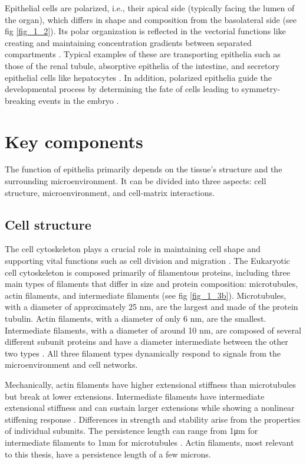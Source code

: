 Epithelial cells are polarized, i.e., their apical side (typically facing the lumen of the organ), which differs in shape and composition from the basolateral side (see fig \ref{fig_1_2}). Its polar organization is reflected in the vectorial functions like creating and maintaining concentration gradients between separated compartments \cite{marchiando2010}. Typical examples of these are transporting epithelia such as those of the renal tubule, absorptive epithelia of the intestine, and secretory epithelial cells like hepatocytes \cite{alberts2015}. In addition, polarized epithelia guide the developmental process by determining the fate of cells leading to symmetry-breaking events in the embryo \cite{kim2018}.

\hypertarget{key-components}{%
	\section{Key components}\label{key-components}}

The function of epithelia primarily depends on the tissue's structure and the surrounding microenvironment. It can be divided into three aspects: cell structure, microenvironment, and cell-matrix interactions.

\hypertarget{cell-structure}{%
	\subsection{Cell structure}\label{cell-structure}}

The cell cytoskeleton plays a crucial role in maintaining cell shape and supporting vital functions such as cell division and migration \cite{alberts2015}. The Eukaryotic cell cytoskeleton is composed primarily of filamentous proteins, including three main types of filaments that differ in size and protein composition: microtubules, actin filaments, and intermediate filaments (see fig \ref{fig_1_3b}). Microtubules, with a diameter of approximately 25 nm, are the largest and made of the protein tubulin. Actin filaments, with a diameter of only 6 nm, are the smallest. Intermediate filaments, with a diameter of around 10 nm, are composed of several different subunit proteins and have a diameter intermediate between the other two types \cite{mofrad2009}. All three filament types dynamically respond to signals from the microenvironment and cell networks.

Mechanically, actin filaments have higher extensional stiffness than microtubules but break at lower extensions. Intermediate filaments have intermediate extensional stiffness and can sustain larger extensions while showing a nonlinear stiffening response \cite{wen2011}. Differences in strength and stability arise from the properties of individual subunits. The persistence length can range from 1\unit{\um} for intermediate filaments to 1\unit{\mm} for microtubules \cite{fletcher2010}. Actin filaments, most relevant to this thesis, have a persistence length of a few microns.

